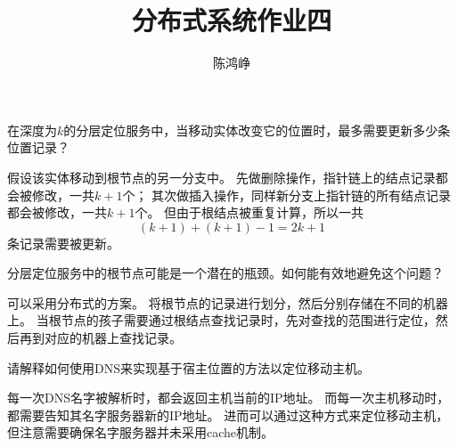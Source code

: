 \documentclass[logo,reportComp]{thesis}
\title{分布式系统作业四}
\subtitle{}
\author{陈鸿峥}
\begin{document}
\maketitle

\begin{question}
在深度为$k$的分层定位服务中，当移动实体改变它的位置时，最多需要更新多少条位置记录？
\end{question}
\begin{answer}
假设该实体移动到根节点的另一分支中。
先做删除操作，指针链上的结点记录都会被修改，一共$k+1$个；
其次做插入操作，同样新分支上指针链的所有结点记录都会被修改，一共$k+1$个。
但由于根结点被重复计算，所以一共
\[(k+1)+(k+1)-1=2k+1\]
条记录需要被更新。
\end{answer}

\begin{question}
分层定位服务中的根节点可能是一个潜在的瓶颈。如何能有效地避免这个问题？
\end{question}
\begin{answer}
可以采用分布式的方案。
将根节点的记录进行划分，然后分别存储在不同的机器上。
当根节点的孩子需要通过根结点查找记录时，先对查找的范围进行定位，然后再到对应的机器上查找记录。
\end{answer}

\begin{question}
请解释如何使用DNS来实现基于宿主位置的方法以定位移动主机。
\end{question}
\begin{answer}
每一次DNS名字被解析时，都会返回主机当前的IP地址。
而每一次主机移动时，都需要告知其名字服务器新的IP地址。
进而可以通过这种方式来定位移动主机，但注意需要确保名字服务器并未采用cache机制。
\end{answer}
\end{document}
